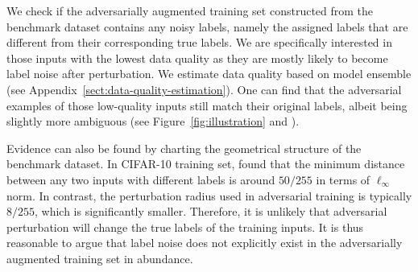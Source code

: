 


We check if the adversarially augmented training set constructed from the benchmark dataset contains any noisy labels, namely the assigned labels that are different from their corresponding true labels.
    We are specifically interested in those inputs with the lowest data quality as they are mostly likely to become label noise after perturbation.
    We estimate data quality based on model ensemble (see Appendix~\ref{sect:data-quality-estimation}).
    One can find that the adversarial examples of those low-quality inputs still match their original labels, albeit being slightly more ambiguous (see Figure~\ref{fig:illustration} and ). 
    
    Evidence can also be found by charting the geometrical structure of the benchmark dataset.
    In CIFAR-10 training set, \citet{Yang2020ACL} found that the minimum distance between any two inputs with different labels is around $50/255$ in terms of $\ell_\infty$ norm. In contrast, the perturbation radius used in adversarial training is typically $8/255$, which is significantly smaller. Therefore, it is unlikely that adversarial perturbation will change the true labels of the training inputs.
    It is thus reasonable to argue that label noise does not explicitly exist in the adversarially augmented training set in abundance.
